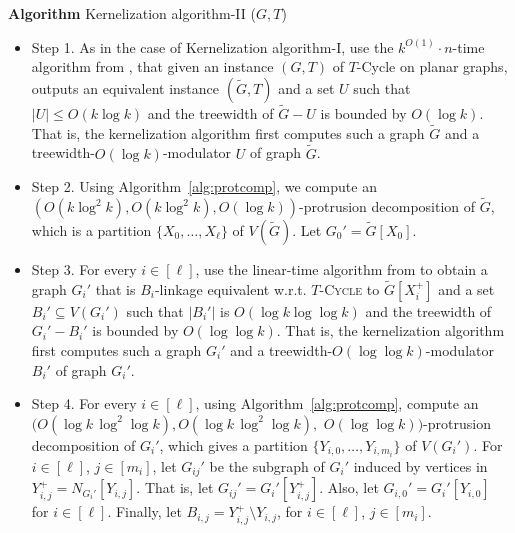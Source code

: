 \documentclass{article}
\numberwithin{claimcounter}{lemma}
\newcommand{\tcycle}{$T$-\textsc{Cycle}\xspace}
\begin{document}
\noindent
{\bf Algorithm} {\sc Kernelization algorithm-II} ($G,T$)
\begin{itemize}
\item  Step 1. As in the case of {\sc Kernelization algorithm-I}, use the $k^{O(1)}\cdot n$-time algorithm from , that given an instance $(G,T)$ of {\sc $T$-Cycle} on planar graphs, outputs an equivalent instance $(\tilde{G},T)$  and  a set $U$ such that $|U|\leq O(k\log k)$ and the treewidth of $\tilde{G}-U$ is bounded by $O(\log k)$. That is, the kernelization algorithm first computes such a graph $\tilde{G}$ and a treewidth-$O(\log k)$-modulator $U$ of graph $\tilde{G}$. 

\item Step 2. Using Algorithm~\ref{alg:protcomp}, we compute an $(O(k \log^2 k), O(k \log^2 k), O(\log k))$-protrusion decomposition of $\tilde{G}$, which is a partition $\{X_0,\dots,X_\ell\}$ of $V(\tilde{G})$. Let $G_0' = \tilde{G}[X_0]$. 


\item Step 3.  For every $i\in [\ell]$, use the linear-time algorithm from  to obtain a graph $G_i'$  that is  $B_i$-linkage equivalent w.r.t. \tcycle to $\tilde{G}[X_i^+]$  and  a set $B_i' \subseteq V(G_i')$ such that $|B_i'|$ is  $ O(\log k\log \log k)$ and the treewidth of $G_i'-B_i'$ is bounded by $O(\log \log k)$. That is, the kernelization algorithm first computes such a graph $G_i'$ and a treewidth-$O(\log \log k)$-modulator $B_i'$ of graph $G_i'$. 

\item Step 4. For every $i \in [\ell]$, using Algorithm~\ref{alg:protcomp},  compute an $(O(\log k \, \log^2 \log k), O(\log k \, \log^2 \log k),$ $ O(\log \log k))$-protrusion decomposition of $G_i'$, which gives a partition $\{Y_{i,0},\dots,Y_{i,m_i}\}$ of $V(G_i')$. For $i \in [\ell]$, $j \in [m_i]$,  let $G_{ij}'$ be the subgraph of $G_i'$   induced  by vertices in $Y_{i,j}^+ = N_{G_{i}'}[Y_{i,j}]$. That is, let $G_{ij}' = G_i'[Y_{i,j}^+] $. Also, let  $G_{i,0}' = G_i'[Y_{i,0}]$ for $i \in [\ell]$.
Finally, let $B_{i,j} = Y_{i,j}^+ \setminus Y_{i,j}$, for $i \in [\ell]$, $j \in [m_i]$.


\end{itemize}
\end{document}
